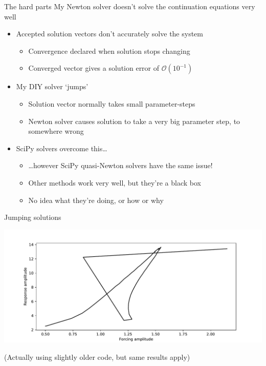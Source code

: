 \documentclass[presentation]{beamer}
\begin{document}
\begin{frame}[label={sec:org517b0cf}]{The hard parts}
My Newton solver doesn't solve the continuation equations very well
\vfill
\begin{itemize}
\item Accepted solution vectors don't accurately solve the system
\begin{itemize}
\item Convergence declared when solution stops changing
\item Converged vector gives a solution error of \(\mathcal{O}(10^{-1})\)
\end{itemize}
\end{itemize}
\vfill
\begin{itemize}
\item My DIY solver `jumps'
\begin{itemize}
\item Solution vector normally takes small parameter-steps
\item Newton solver causes solution to take a very big parameter step, to somewhere wrong
\end{itemize}
\end{itemize}
\vfill
\begin{itemize}
\item SciPy solvers overcome this\ldots{}
\begin{itemize}
\item \ldots{}however SciPy quasi-Newton solvers have the same issue!
\item Other methods work very well, but they're a black box
\item No idea what they're doing, or how or why
\end{itemize}
\end{itemize}
\end{frame}

\begin{frame}[label={sec:orgeade945}]{Jumping solutions}
\begin{center}
\includegraphics[width=.9\linewidth]{./jump.pdf}
\end{center}

(Actually using slightly older code, but same results apply)
\end{frame}
\end{document}
